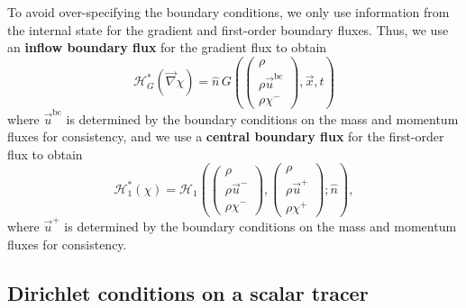 \documentclass{report}
\numberwithin{equation}{section}
\begin{document}
To avoid over-specifying the boundary conditions, we only use information from the internal state for the gradient and first-order boundary fluxes. Thus, we use an \textbf{inflow boundary flux} for the gradient flux to obtain
\begin{equation}
    \mathcal{H}_G^*(\overrightarrow{\nabla} \chi) = \hat n \, G \left( \begin{pmatrix} \rho \\ \rho \vec u^{\text{bc}} \\ \rho \chi^- \end{pmatrix}, \overrightarrow{x}, t \right)
\end{equation}
where $\vec u^{\text{bc}}$ is determined by the boundary conditions on the mass and momentum fluxes for consistency, and we use a \textbf{central boundary flux} for the first-order flux to obtain
\begin{equation}
    \mathcal{H}_1^*(\chi) = \mathcal{H}_1 \left(
        \begin{pmatrix} \rho \\ \rho \vec u^- \\ \rho \chi^- \end{pmatrix}, 
        \begin{pmatrix} \rho \\ \rho \vec u^+ \\ \rho \chi^+ \end{pmatrix}; 
        \hat n
    \right),
\end{equation}
where $\vec u^+$ is determined by the boundary conditions on the mass and momentum fluxes for consistency. 

\subsection{Dirichlet conditions on a scalar tracer}
\end{document}

